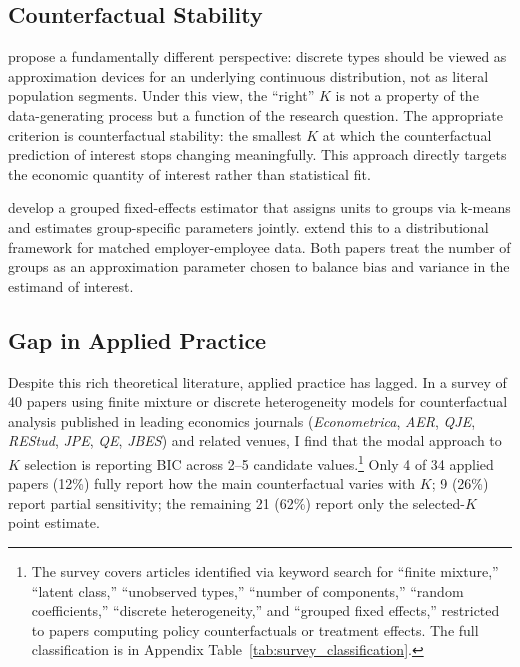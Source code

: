 \documentclass[12pt]{article}
\begin{document}
\subsection{Counterfactual Stability}

\citet{bonhomme2022} propose a fundamentally different perspective: discrete types should be viewed as approximation devices for an underlying continuous distribution, not as literal population segments. Under this view, the ``right'' $K$ is not a property of the data-generating process but a function of the research question. The appropriate criterion is counterfactual stability: the smallest $K$ at which the counterfactual prediction of interest stops changing meaningfully. This approach directly targets the economic quantity of interest rather than statistical fit.

\citet{bonhomme2015} develop a grouped fixed-effects estimator that assigns units to groups via k-means and estimates group-specific parameters jointly. \citet{bonhomme2019} extend this to a distributional framework for matched employer-employee data. Both papers treat the number of groups as an approximation parameter chosen to balance bias and variance in the estimand of interest.

\subsection{Gap in Applied Practice}

Despite this rich theoretical literature, applied practice has lagged. In a survey of 40 papers using finite mixture or discrete heterogeneity models for counterfactual analysis published in leading economics journals (\textit{Econometrica}, \textit{AER}, \textit{QJE}, \textit{REStud}, \textit{JPE}, \textit{QE}, \textit{JBES}) and related venues, I find that the modal approach to $K$ selection is reporting BIC across 2--5 candidate values.\footnote{The survey covers articles identified via keyword search for ``finite mixture,'' ``latent class,'' ``unobserved types,'' ``number of components,'' ``random coefficients,'' ``discrete heterogeneity,'' and ``grouped fixed effects,'' restricted to papers computing policy counterfactuals or treatment effects. The full classification is in Appendix Table~\ref{tab:survey_classification}.} Only 4 of 34 applied papers (12\%) fully report how the main counterfactual varies with $K$; 9 (26\%) report partial sensitivity; the remaining 21 (62\%) report only the selected-$K$ point estimate.
\end{document}
